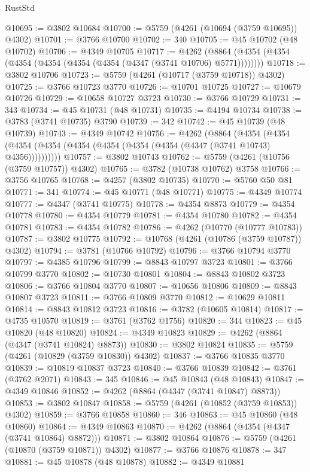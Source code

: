 \begin{lexlean}{RustStd}
\begin{coremodule}
@10695 := @3802 @10684
@10700 := @5759 (@4261 (@10694 (@3759 @10695)) @4302)
@10701 := @3766 @10700
@10702 := 340
@10705 := @45 @10702 (@48 @10702)
@10706 := @4349 @10705
@10717 := @4262 (@8864 (@4354 (@4354 (@4354 (@4354 (@4354 (@4354 (@4347 (@3741 @10706) @5771))))))))
@10718 := @3802 @10706
@10723 := @5759 (@4261 (@10717 (@3759 @10718)) @4302)
@10725 := @3766 @10723 @3770
@10726 := @10701 @10725
@10727 := @10679 @10726
@10729 := @10658 @10727 @3723
@10730 := @3766 @10729
@10731 := 343
@10734 := @45 @10731 (@48 @10731)
@10735 := @4194 @10734
@10738 := @3783 (@3741 @10735) @3790
@10739 := 342
@10742 := @45 @10739 (@48 @10739)
@10743 := @4349 @10742
@10756 := @4262
    (@8864
      (@4354 (@4354 (@4354 (@4354 (@4354 (@4354 (@4354 (@4354 (@4347 (@3741 @10743) @4356))))))))))
@10757 := @3802 @10743
@10762 := @5759 (@4261 (@10756 (@3759 @10757)) @4302)
@10765 := @3782 (@10738 @10762) @3758
@10766 := @3756 @10765
@10768 := @4257 (@3802 @10735)
@10770 := @5760 @50 @81
@10771 := 341
@10774 := @45 @10771 (@48 @10771)
@10775 := @4349 @10774
@10777 := @4347 (@3741 @10775)
@10778 := @4354 @8873
@10779 := @4354 @10778
@10780 := @4354 @10779
@10781 := @4354 @10780
@10782 := @4354 @10781
@10783 := @4354 @10782
@10786 := @4262 (@10770 (@10777 @10783))
@10787 := @3802 @10775
@10792 := @10768 (@4261 (@10786 (@3759 @10787)) @4302)
@10794 := @3781 (@10766 @10792)
@10796 := @3766 @10794 @3770
@10797 := @4385 @10796
@10799 := @8843 @10797 @3723
@10801 := @3766 @10799 @3770
@10802 := @10730 @10801
@10804 := @8843 @10802 @3723
@10806 := @3766 @10804 @3770
@10807 := @10656 @10806
@10809 := @8843 @10807 @3723
@10811 := @3766 @10809 @3770
@10812 := @10629 @10811
@10814 := @8843 @10812 @3723
@10816 := @3782 (@10605 @10814)
@10817 := @4735 @10570
@10819 := @3761 (@3762 @1756)
@10820 := 344
@10823 := @45 @10820 (@48 @10820)
@10824 := @4349 @10823
@10829 := @4262 (@8864 (@4347 (@3741 @10824) @8873))
@10830 := @3802 @10824
@10835 := @5759 (@4261 (@10829 (@3759 @10830)) @4302)
@10837 := @3766 @10835 @3770
@10839 := @10819 @10837 @3723
@10840 := @3766 @10839
@10842 := @3761 (@3762 @2071)
@10843 := 345
@10846 := @45 @10843 (@48 @10843)
@10847 := @4349 @10846
@10852 := @4262 (@8864 (@4347 (@3741 @10847) @8873))
@10853 := @3802 @10847
@10858 := @5759 (@4261 (@10852 (@3759 @10853)) @4302)
@10859 := @3766 @10858
@10860 := 346
@10863 := @45 @10860 (@48 @10860)
@10864 := @4349 @10863
@10870 := @4262 (@8864 (@4354 (@4347 (@3741 @10864) @8872)))
@10871 := @3802 @10864
@10876 := @5759 (@4261 (@10870 (@3759 @10871)) @4302)
@10877 := @3766 @10876
@10878 := 347
@10881 := @45 @10878 (@48 @10878)
@10882 := @4349 @10881

\end{coremodule}
\end{lexlean}
